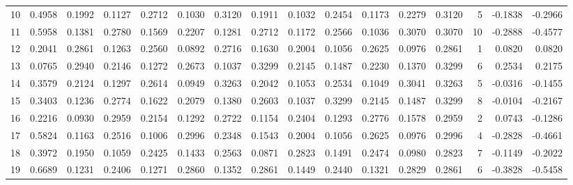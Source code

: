 \begin{tabular}{lrrrrrrrrrrrrrrr}
10 &      0.4958 &  0.1992 &  0.1127 &  0.2712 &  0.1030 &  0.3120 &  0.1911 &  0.1032 &  0.2454 &  0.1173 &   0.2279 &     0.3120 &      5 &                   -0.1838 &                    -0.2966 \\
11 &      0.5958 &  0.1381 &  0.2780 &  0.1569 &  0.2207 &  0.1281 &  0.2712 &  0.1172 &  0.2566 &  0.1036 &   0.3070 &     0.3070 &     10 &                   -0.2888 &                    -0.4577 \\
12 &      0.2041 &  0.2861 &  0.1263 &  0.2560 &  0.0892 &  0.2716 &  0.1630 &  0.2004 &  0.1056 &  0.2625 &   0.0976 &     0.2861 &      1 &                    0.0820 &                     0.0820 \\
13 &      0.0765 &  0.2940 &  0.2146 &  0.1272 &  0.2673 &  0.1037 &  0.3299 &  0.2145 &  0.1487 &  0.2230 &   0.1370 &     0.3299 &      6 &                    0.2534 &                     0.2175 \\
14 &      0.3579 &  0.2124 &  0.1297 &  0.2614 &  0.0949 &  0.3263 &  0.2042 &  0.1053 &  0.2534 &  0.1049 &   0.3041 &     0.3263 &      5 &                   -0.0316 &                    -0.1455 \\
15 &      0.3403 &  0.1236 &  0.2774 &  0.1622 &  0.2079 &  0.1380 &  0.2603 &  0.1037 &  0.3299 &  0.2145 &   0.1487 &     0.3299 &      8 &                   -0.0104 &                    -0.2167 \\
16 &      0.2216 &  0.0930 &  0.2959 &  0.2154 &  0.1292 &  0.2722 &  0.1154 &  0.2404 &  0.1293 &  0.2776 &   0.1578 &     0.2959 &      2 &                    0.0743 &                    -0.1286 \\
17 &      0.5824 &  0.1163 &  0.2516 &  0.1006 &  0.2996 &  0.2348 &  0.1543 &  0.2004 &  0.1056 &  0.2625 &   0.0976 &     0.2996 &      4 &                   -0.2828 &                    -0.4661 \\
18 &      0.3972 &  0.1950 &  0.1059 &  0.2425 &  0.1433 &  0.2563 &  0.0871 &  0.2823 &  0.1491 &  0.2474 &   0.0980 &     0.2823 &      7 &                   -0.1149 &                    -0.2022 \\
19 &      0.6689 &  0.1231 &  0.2406 &  0.1271 &  0.2860 &  0.1352 &  0.2861 &  0.1449 &  0.2440 &  0.1321 &   0.2829 &     0.2861 &      6 &                   -0.3828 &                    -0.5458 \\
\bottomrule
\end{tabular}
